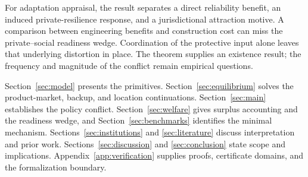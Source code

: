 For adaptation appraisal, the result separates a direct reliability benefit, an induced private-resilience response, and a jurisdictional attraction motive. A comparison between engineering benefits and construction cost can miss the private--social readiness wedge. Coordination of the protective input alone leaves that underlying distortion in place. The theorem supplies an existence result; the frequency and magnitude of the conflict remain empirical questions.

Section~\ref{sec:model} presents the primitives. Section~\ref{sec:equilibrium} solves the product-market, backup, and location continuations. Section~\ref{sec:main} establishes the policy conflict. Section~\ref{sec:welfare} gives surplus accounting and the readiness wedge, and Section~\ref{sec:benchmarks} identifies the minimal mechanism. Sections~\ref{sec:institutions} and \ref{sec:literature} discuss interpretation and prior work. Sections~\ref{sec:discussion} and \ref{sec:conclusion} state scope and implications. Appendix~\ref{app:verification} supplies proofs, certificate domains, and the formalization boundary.
